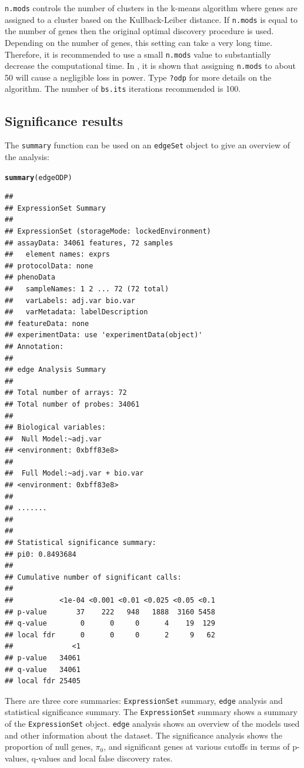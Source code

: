 \documentclass{article}\usepackage[]{graphicx}\usepackage[]{color}
\makeatletter
\newcommand{\hlstd}[1]{\textcolor[rgb]{0.345,0.345,0.345}{#1}}%
\newcommand{\hlkwd}[1]{\textcolor[rgb]{0.737,0.353,0.396}{\textbf{#1}}}%
\newenvironment{kframe}{%
 \def\at@end@of@kframe{}%
 \ifinner\ifhmode%
  \def\at@end@of@kframe{\end{minipage}}%
  \begin{minipage}{\columnwidth}%
 \fi\fi%
 \def\FrameCommand##1{\hskip\@totalleftmargin \hskip-\fboxsep
 \colorbox{shadecolor}{##1}\hskip-\fboxsep
     \hskip-\linewidth \hskip-\@totalleftmargin \hskip\columnwidth}%
 \MakeFramed {\advance\hsize-\width
   \@totalleftmargin\z@ \linewidth\hsize
   \@setminipage}}%
 {\par\unskip\endMakeFramed%
 \at@end@of@kframe}
\newenvironment{knitrout}{}{} %
\makeatother
\begin{document}
{\tt n.mods} controls the number of clusters in the k-means algorithm where genes are assigned to a cluster based on the Kullback-Leiber distance. If {\tt n.mods} is equal to the number of genes then the original optimal discovery procedure is used. Depending on the number of genes, this setting can take a very long time.  Therefore, it is recommended to use a small {\tt n.mods} value to substantially decrease the computational time. In \cite{woo:leek:storey:2011}, it is shown that assigning {\tt n.mods} to about 50 will cause a negligible loss in power. Type {\tt ?odp} for more details on the algorithm. The number of {\tt bs.its} iterations recommended is 100.

\subsection{Significance results}
The {\tt summary} function can be used on an {\tt edgeSet} object to give an overview of the analysis:
\begin{knitrout}
\color{fgcolor}\begin{kframe}
\begin{alltt}
\hlkwd{summary}\hlstd{(edgeODP)}
\end{alltt}
\begin{verbatim}
## 
## ExpressionSet Summary 
##  
## ExpressionSet (storageMode: lockedEnvironment)
## assayData: 34061 features, 72 samples 
##   element names: exprs 
## protocolData: none
## phenoData
##   sampleNames: 1 2 ... 72 (72 total)
##   varLabels: adj.var bio.var
##   varMetadata: labelDescription
## featureData: none
## experimentData: use 'experimentData(object)'
## Annotation:  
## 
## edge Analysis Summary 
##  
## Total number of arrays: 72 
## Total number of probes: 34061 
##  
## Biological variables: 
## 	Null Model:~adj.var
## <environment: 0xbff83e8>
## 
## 	Full Model:~adj.var + bio.var
## <environment: 0xbff83e8>
## 
## ....... 
##  
## 
## Statistical significance summary:
## pi0:	0.8493684	
## 
## Cumulative number of significant calls:
## 
##           <1e-04 <0.001 <0.01 <0.025 <0.05 <0.1
## p-value       37    222   948   1888  3160 5458
## q-value        0      0     0      4    19  129
## local fdr      0      0     0      2     9   62
##              <1
## p-value   34061
## q-value   34061
## local fdr 25405
\end{verbatim}
\end{kframe}
\end{knitrout}
There are three core summaries: {\tt ExpressionSet} summary, {\tt edge} analysis and statistical significance summary. The {\tt ExpressionSet} summary shows a summary of the {\tt ExpressionSet} object. {\tt edge} analysis shows an overview of the models used and other information about the dataset. The significance analysis shows the proportion of null genes, $\pi_{0}$, and significant genes at various cutoffs in terms of p-values, q-values and local false discovery rates.
\end{document}

